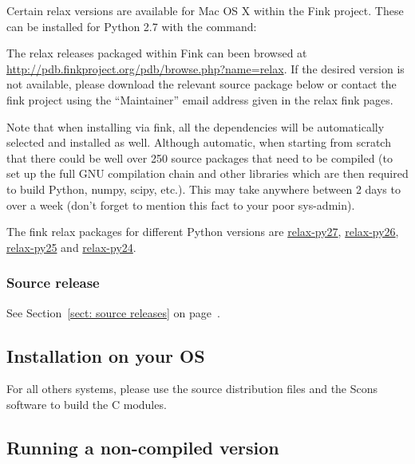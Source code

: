 Certain relax versions are available for Mac OS X within the Fink project.
These can be installed for Python 2.7 with the command:


The relax releases packaged within Fink can been browsed at \href{http://pdb.finkproject.org/pdb/browse.php?name=relax}{http://pdb.finkproject.org/pdb/browse.php?name=relax}.
If the desired version is not available, please download the relevant source package below or contact the fink project using the ``Maintainer'' email address given in the relax fink pages.

Note that when installing via fink, all the dependencies will be automatically selected and installed as well.
Although automatic, when starting from scratch that there could be well over 250 source packages that need to be compiled (to set up the full GNU compilation chain and other libraries which are then required to build Python, numpy, scipy, etc.).
This may take anywhere between 2 days to over a week (don't forget to mention this fact to your poor sys-admin).

The fink relax packages for different Python versions are \href{http://pdb.finkproject.org/pdb/package.php/relax-py27}{relax-py27}, \href{http://pdb.finkproject.org/pdb/package.php/relax-py26}{relax-py26}, \href{http://pdb.finkproject.org/pdb/package.php/relax-py25}{relax-py25} and \href{http://pdb.finkproject.org/pdb/package.php/relax-py24}{relax-py24}.

\subsubsection{Source release}

See Section~\ref{sect: source releases} on page~\pageref{sect: source releases}.


\subsection{Installation on your OS}

For all others systems, please use the source distribution files and the Scons software to build the C modules.



\subsection{Running a non-compiled version}

